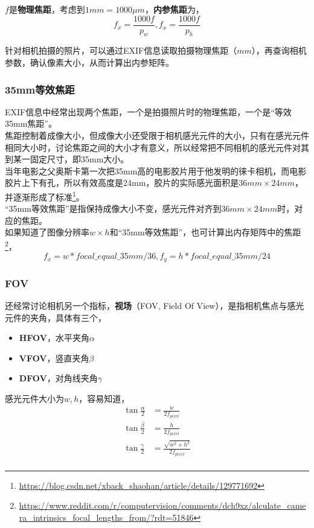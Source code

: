 	$f$是\textbf{物理焦距}，考虑到$1mm = 1000\mu m$，\textbf{内参焦距}为，
	$$
		f_x = \frac{1000f}{p_w}, f_x = \frac{1000f}{p_h}
	$$

	针对相机拍摄的照片，可以通过EXIF信息读取拍摄物理焦距（$mm$），再查询相机参数，确认像素大小，从而计算出内参矩阵。

\subsubsection*{35mm等效焦距}

	EXIF信息中经常出现两个焦距，一个是拍摄照片时的物理焦距，一个是“等效35mm焦距”。\\

	焦距控制着成像大小，但成像大小还受限于相机感光元件的大小，只有在感光元件相同大小时，讨论焦距之间的大小才有意义，所以经常把不同相机的感光元件对其到某一固定尺寸，即35mm大小。\\

	当年电影之父奥斯卡第一次把35mm高的电影胶片用于他发明的徕卡相机，而电影胶片上下有孔，所以有效高度是24mm，胶片的实际感光面积是$36mm \times 24mm$，并逐渐形成了标准\footnote{\url{https://blog.csdn.net/xback_shaohan/article/details/129771692}}。\\

	“35mm等效焦距”是指保持成像大小不变，感光元件对齐到$36mm \times 24mm$时，对应的焦距。\\

	如果知道了图像分辨率$w \times h$和“35mm等效焦距”，也可计算出内存矩阵中的焦距\footnote{\url{https://www.reddit.com/r/computervision/comments/dch9xz/alculate_camera_intrinsics_focal_lengths_from/?rdt=51846}}，
	$$
		f_x = w * focal\_equal\_35mm/36, f_y = h * focal\_equal\_35mm/24
	$$

\subsubsection*{FOV}
	还经常讨论相机另一个指标，\textbf{视场}（FOV, Field Of View），是指相机焦点与感光元件的夹角，具体有三个，
	\begin{itemize}
		\item \textbf{HFOV}，水平夹角$\alpha$
		\item \textbf{VFOV}，竖直夹角$\beta$
		\item \textbf{DFOV}，对角线夹角$\gamma$
	\end{itemize}

	感光元件大小为$w,h$，容易知道，
	\begin{align*}
		\tan\frac{\alpha}{2} &= \frac{w}{2f_{pixel}}\\
		\tan\frac{\beta}{2} &= \frac{h}{2f_{pixel}}\\
		\tan\frac{\gamma}{2} &= \frac{\sqrt{w^2 + h^2}}{2f_{pixel}}\\
	\end{align*}

